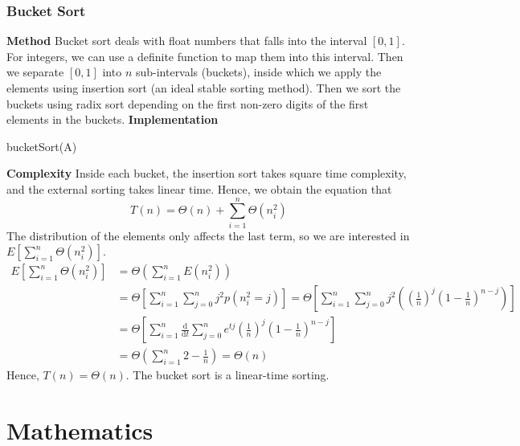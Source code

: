 \documentclass[11pt]{article}
\begin{document}
\subsubsection{Bucket Sort} \noindent
\textbf{Method} Bucket sort deals with float numbers that falls into the interval $[0,1]$. For integers, we can use a definite function to map them into this interval. Then we separate $[0, 1]$ into $n$ sub-intervals (buckets), inside which we apply the elements using insertion sort (an ideal stable sorting method). Then we sort the buckets using radix sort depending on the first non-zero digits of the first elements in the buckets. \clearpage
\noindent
\textbf{Implementation} 
\begin{algorithm}
    \caption{bucketSort(A)}
    \label{bucketSort}
    \begin{algorithmic}
        \ENDFOR
    \end{algorithmic}
\end{algorithm} \par \noindent
\textbf{Complexity}
Inside each bucket, the insertion sort takes square time complexity, and the external sorting takes linear time. Hence, we obtain the equation that
\begin{equation}
    T(n) = \Theta(n) + \sum_{i=1}^{n} \Theta(n_i^2)
\end{equation}
The distribution of the elements only affects the last term, so we are interested in $E[\sum_{i=1}^{n} \Theta(n_i^2)]$.
\begin{equation}
\begin{aligned}
    E[\sum_{i=1}^{n} \Theta(n_i^2)] &= \Theta(\sum_{i=1}^n E(n_i^2)) \\
    &= \Theta\left[\sum_{i=1}^n \sum_{j = 0}^{n} j^2p(n_i^2 = j)\right] = \Theta\left[\sum_{i=1}^n \sum_{j = 0}^{n} j^2 ((\frac{1}{n})^j(1-\frac{1}{n})^{n-j})\right] \\
    &= \Theta\left[\sum_{i=1}^n \frac{\text{d}}{\text{d}t}\sum_{j=0}^{n}e^{tj}(\frac{1}{n})^{j}(1-\frac{1}{n})^{n-j}\right]\\
    &= \Theta(\sum_{i=1}^n 2-\frac{1}{n}) = \Theta(n)
\end{aligned}
\end{equation}
Hence, $T(n) = \Theta(n)$. The bucket sort is a linear-time sorting.
\section{Mathematics}
\end{document}
